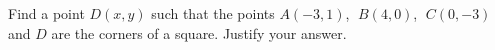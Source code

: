 {Find a point $D(x, y)$ such that the points $A(-3, 1)$, $\;B(4, 0)$, $\;C(0, -3)$ and $D$ are the corners of a square.  Justify your answer.}
{}